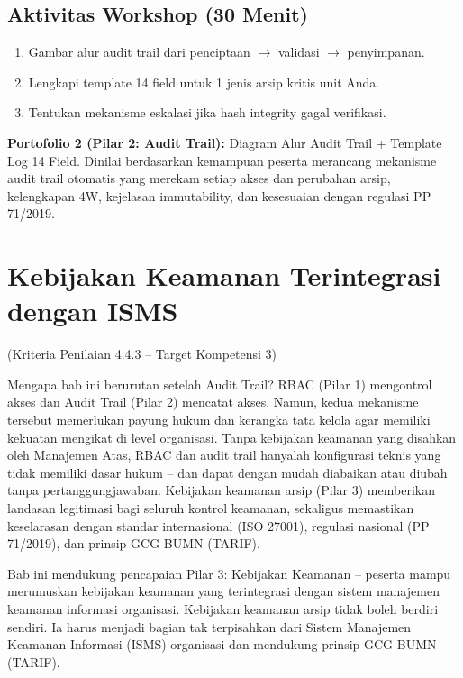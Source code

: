 \documentclass[12pt,a4paper]{report}
\begin{document}

\section{Aktivitas Workshop (30 Menit)}
\begin{enumerate}[leftmargin=*]
    \item Gambar alur audit trail dari penciptaan $\rightarrow$ validasi $\rightarrow$ penyimpanan.
    \item Lengkapi template 14 field untuk 1 jenis arsip kritis unit Anda.
    \item Tentukan mekanisme eskalasi jika hash integrity gagal verifikasi.
\end{enumerate}

\begin{outputbox}
\textbf{Portofolio 2 (Pilar 2: Audit Trail):} Diagram Alur Audit Trail + Template Log 14 Field. Dinilai berdasarkan kemampuan peserta merancang mekanisme audit trail otomatis yang merekam setiap akses dan perubahan arsip, kelengkapan 4W, kejelasan immutability, dan kesesuaian dengan regulasi PP 71/2019.
\end{outputbox}

\chapter{Kebijakan Keamanan Terintegrasi dengan ISMS}
(Kriteria Penilaian 4.4.3 -- Target Kompetensi 3)

Mengapa bab ini berurutan setelah Audit Trail? RBAC (Pilar 1) mengontrol akses dan Audit Trail (Pilar 2) mencatat akses. Namun, kedua mekanisme tersebut memerlukan payung hukum dan kerangka tata kelola agar memiliki kekuatan mengikat di level organisasi. Tanpa kebijakan keamanan yang disahkan oleh Manajemen Atas, RBAC dan audit trail hanyalah konfigurasi teknis yang tidak memiliki dasar hukum -- dan dapat dengan mudah diabaikan atau diubah tanpa pertanggungjawaban. Kebijakan keamanan arsip (Pilar 3) memberikan landasan legitimasi bagi seluruh kontrol keamanan, sekaligus memastikan keselarasan dengan standar internasional (ISO 27001), regulasi nasional (PP 71/2019), dan prinsip GCG BUMN (TARIF).

Bab ini mendukung pencapaian Pilar 3: Kebijakan Keamanan -- peserta mampu merumuskan kebijakan keamanan yang terintegrasi dengan sistem manajemen keamanan informasi organisasi. Kebijakan keamanan arsip tidak boleh berdiri sendiri. Ia harus menjadi bagian tak terpisahkan dari Sistem Manajemen Keamanan Informasi (ISMS) organisasi dan mendukung prinsip GCG BUMN (TARIF).
\end{document}
